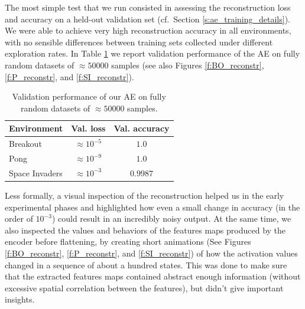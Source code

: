 The most simple test that we run consisted in assessing the reconstruction loss
and accuracy on a held-out validation set (cf.\ Section \ref{s:ae_training_details}). 
We were able to achieve very high reconstruction accuracy in all environments, 
with no sensible differences between training sets collected under different 
exploration rates. In Table \ref{t:ae_training_precision} we report validation 
performance of the AE on fully random datasets of $\approx50000$ samples (see
also Figures \ref{f:BO_reconstr}, \ref{f:P_reconstr}, and \ref{f:SI_reconstr}).
%
\begin{table}
    \centering
    \begin{tabular}{l c c} 
	\hline
	Environment    & Val. loss        & Val. accuracy \\ 
	\hline 
	Breakout       & $\approx10^{-5}$ & $1.0$ \\
	Pong           & $\approx10^{-9}$ & $1.0$ \\
	Space Invaders & $\approx10^{-3}$ & $0.9987$ \\
	\hline
    \end{tabular}
    \caption[AE validation performance]{Validation performance of our AE on
	     fully random datasets of $\approx50000$ samples.}
    \label{t:ae_training_precision}
\end{table}
%
Less formally, a visual inspection of the reconstruction helped us in the early 
experimental phases and highlighted how even a small change in accuracy (in the
order of $10^{-3}$) could result in an incredibly noisy output.
At the same time, we also inspected the values and behaviors of the features 
maps produced by the encoder before flattening, by creating short animations 
(See Figures \ref{f:BO_reconstr}, \ref{f:P_reconstr}, and \ref{f:SI_reconstr}) 
of how the activation values changed in a sequence of about a hundred states. 
This was done to make sure that the extracted features maps contained abstract
enough information (without excessive spatial correlation between the features),
but didn't give important insights.

